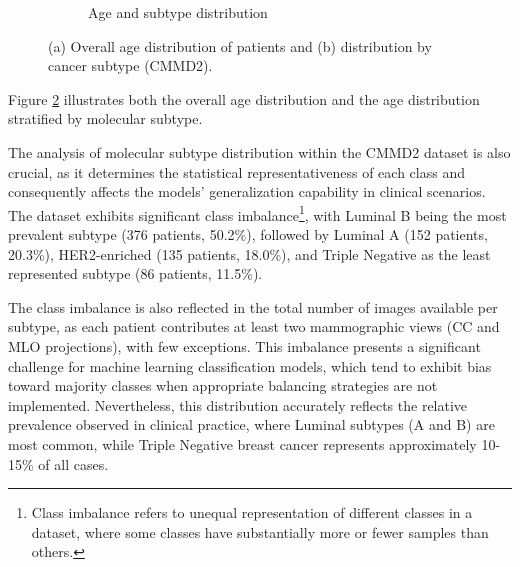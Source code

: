 \documentclass[a4paper,10pt]{book}
\begin{document}
\begin{figure}[h!]
\begin{subfigure}[c]{0.49\textwidth}
		\caption{Age and subtype distribution}
		\label{fig:age_subtype}
	\end{subfigure}
	\caption[CMMD2 Age distribution]{(a) Overall age distribution of patients and (b) distribution by cancer subtype (CMMD2).}
	\label{fig:age_dist_all}
\end{figure}

Figure \ref{fig:age_dist_all} illustrates both the overall age distribution and the age distribution stratified by molecular subtype.

The analysis of molecular subtype distribution within the CMMD2 dataset is also crucial, as it determines the statistical representativeness of each class and consequently affects the models' generalization capability in clinical scenarios. The dataset exhibits significant class imbalance\footnote{Class imbalance refers to unequal representation of different classes in a dataset, where some classes have substantially more or fewer samples than others.}, with Luminal B being the most prevalent subtype (376 patients, 50.2\%), followed by Luminal A (152 patients, 20.3\%), HER2-enriched (135 patients, 18.0\%), and Triple Negative as the least represented subtype (86 patients, 11.5\%).

The class imbalance is also reflected in the total number of images available per subtype, as each patient contributes at least two mammographic views (CC and MLO projections), with few exceptions. This imbalance presents a significant challenge for machine learning classification models, which tend to exhibit bias toward majority classes when appropriate balancing strategies are not implemented. Nevertheless, this distribution accurately reflects the relative prevalence observed in clinical practice, where Luminal subtypes (A and B) are most common, while Triple Negative breast cancer represents approximately 10-15\% of all cases.
\end{document}

